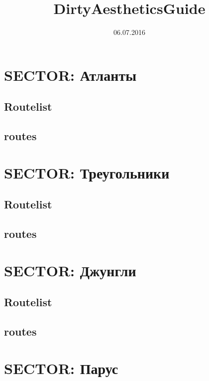 \documentclass[8pt, a4paper,notitlepage,openany]{report}
\begin{document}
\title{DirtyAestheticsGuide}
\date{06.07.2016}
\tableofcontents
\pagestyle{fancy}








\chapter{SECTOR:  Атланты}
\section*{Routelist}

\newpage
\section*{routes}





\chapter{SECTOR:  Треугольники}
\section*{Routelist}

\newpage
\section*{routes}



\chapter{SECTOR:  Джунгли}
\section*{Routelist}

\newpage
\section*{routes}



\chapter{SECTOR: Парус}
\end{document}
